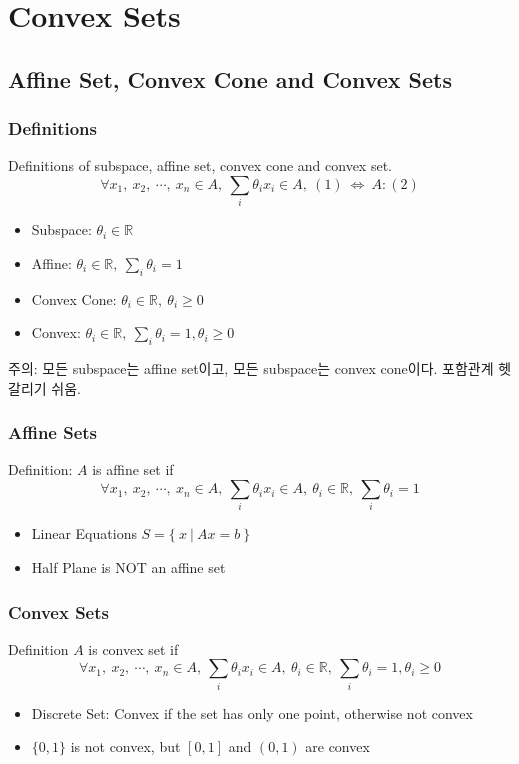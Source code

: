 \section{Convex Sets}

\subsection{Affine Set, Convex Cone and Convex Sets}

\subsubsection*{Definitions}
Definitions of subspace, affine set, convex cone and convex set.
$$
    \forall x_1,~x_2,~\cdots,~x_n \in A,~\sum_i \theta_i x_i \in A,~(1)~\Leftrightarrow~A: (2)
$$
\begin{itemize}
    \item Subspace: $\theta_i \in \mathbb{R}$
    \item Affine: $\theta_i \in \mathbb{R},~ \sum_i \theta_i = 1$
    \item Convex Cone: $\theta_i \in \mathbb{R},~ \theta_i \geq 0$
    \item Convex: $\theta_i \in \mathbb{R},~ \sum_i \theta_i = 1, \theta_i \geq 0$
\end{itemize}

주의: 모든 subspace는 affine set이고, 모든 subspace는 convex cone이다. 포함관계 헷갈리기 쉬움.

\subsubsection*{Affine Sets}
Definition: $A$ is affine set if
$$
\forall x_1,~x_2,~\cdots,~x_n \in A,~\sum_i \theta_i x_i \in A,~\theta_i \in \mathbb{R},~ \sum_i \theta_i = 1
$$
\begin{itemize}
    \item Linear Equations $S = \{~x~|~Ax=b~\}$
    \item Half Plane is NOT an affine set
\end{itemize}

\subsubsection*{Convex Sets}
Definition $A$ is convex set if
$$
\forall x_1,~x_2,~\cdots,~x_n \in A,~\sum_i \theta_i x_i \in A,~\theta_i \in \mathbb{R},~ \sum_i \theta_i = 1, \theta_i \geq 0
$$
\begin{itemize}
    \item Discrete Set: Convex if the set has only one point, otherwise not convex
    \item $\{0,1\}$ is not convex, but $[0,1]$ and $(0,1)$ are convex
\end{itemize}

